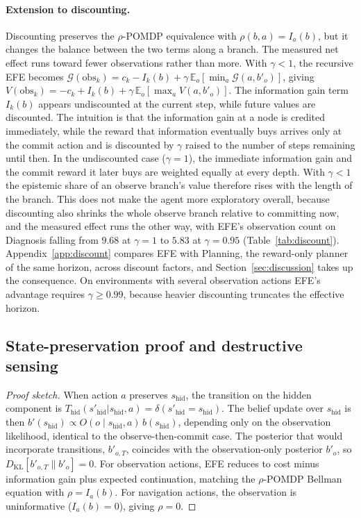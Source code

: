 \paragraph{Extension to discounting.} Discounting preserves the $\rho$-POMDP equivalence with $\rho(b,a) = I_a(b)$, but it changes the balance between the two terms along a branch. The measured net effect runs toward fewer observations rather than more. With $\gamma < 1$, the recursive EFE becomes $\mathcal{G}(\text{obs}_k) = c_k - I_k(b) + \gamma\, \mathbb{E}_o[\min_a \mathcal{G}(a, b'_o)]$, giving $V(\text{obs}_k) = -c_k + I_k(b) + \gamma\, \mathbb{E}_o[\max_a V(a, b'_o)]$. The information gain term $I_k(b)$ appears undiscounted at the current step, while future values are discounted. The intuition is that the information gain at a node is credited immediately, while the reward that information eventually buys arrives only at the commit action and is discounted by $\gamma$ raised to the number of steps remaining until then. In the undiscounted case ($\gamma{=}1$), the immediate information gain and the commit reward it later buys are weighted equally at every depth. With $\gamma < 1$ the epistemic share of an observe branch's value therefore rises with the length of the branch. This does not make the agent more exploratory overall, because discounting also shrinks the whole observe branch relative to committing now, and the measured effect runs the other way, with EFE's observation count on Diagnosis falling from $9.68$ at $\gamma{=}1$ to $5.83$ at $\gamma{=}0.95$ (Table~\ref{tab:discount}). Appendix~\ref{app:discount} compares EFE with Planning, the reward-only planner of the same horizon, across discount factors, and Section~\ref{sec:discussion} takes up the consequence. On environments with several observation actions EFE's advantage requires $\gamma \geq 0.99$, because heavier discounting truncates the effective horizon.

\subsection{State-preservation proof and destructive sensing}
\label{app:theory_factored}

\begin{proof}[Proof sketch]
When action $a$ preserves $s_{\mathrm{hid}}$, the transition on the hidden component is $T_{\mathrm{hid}}(s'_{\mathrm{hid}} | s_{\mathrm{hid}}, a) = \delta(s'_{\mathrm{hid}} = s_{\mathrm{hid}})$. The belief update over $s_{\mathrm{hid}}$ is then $b'(s_{\mathrm{hid}}) \propto O(o \mid s_{\mathrm{hid}}, a)\, b(s_{\mathrm{hid}})$, depending only on the observation likelihood, identical to the observe-then-commit case. The posterior that would incorporate transitions, $b'_{o,T}$, coincides with the observation-only posterior $b'_o$, so $D_{\mathrm{KL}}[b'_{o,T} \| b'_o] = 0$. For observation actions, EFE reduces to cost minus information gain plus expected continuation, matching the $\rho$-POMDP Bellman equation with $\rho = I_a(b)$. For navigation actions, the observation is uninformative ($I_a(b) = 0$), giving $\rho = 0$.
\end{proof}

